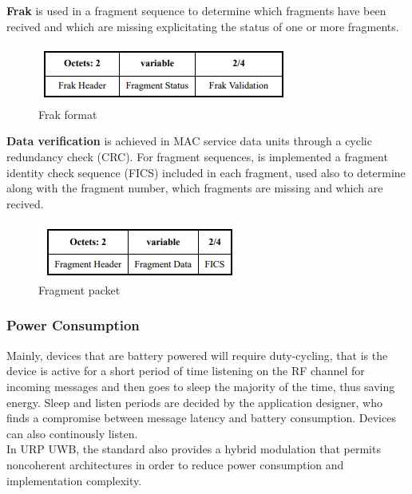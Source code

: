\documentclass[conference]{IEEEtran}
\begin{document}
\textbf{Frak} is used in a fragment sequence to determine which fragments have been recived
and which are missing explicitating the status of one or more fragments.\\

\begin{figure} [!h]
  \centering
  \includegraphics[width=.7\linewidth]{FRAK}
  \caption{Frak format}
  \label{fig:ack}
\end{figure}


\textbf{Data verification} is achieved in MAC service data units through a cyclic redundancy
check (CRC). For fragment sequences, is implemented a fragment identity check sequence (FICS)
included in each fragment, used also to determine along with the fragment number, which
fragments are missing and which are recived.\\

\begin{figure}[!h]
  \centering
  \includegraphics[width=.6\linewidth]{fragment-packet}
  \caption{Fragment packet}
  \label{fig:fragment}
\end{figure}

\subsubsection{Power Consumption}
Mainly, devices that are battery powered will require duty-cycling, that is
the device is active for a short period of time listening on the RF channel for incoming
messages and then goes to sleep the majority of the time, thus saving energy.
Sleep and listen periods are decided by the application designer, who finds a compromise
between message latency and battery consumption. Devices can also continously listen.\\

In URP UWB, the standard\cite{10794632} also provides a hybrid modulation that permits noncoherent 
architectures in order to reduce power consumption and implementation complexity.\\
\end{document}
